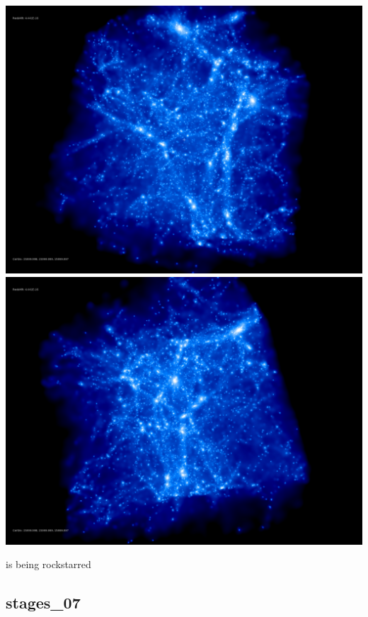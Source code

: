 \includegraphics[scale=0.1]{NGenIC_26214/rotate_00074.jpg} 
\includegraphics[scale=0.1]{NGenIC_26214/rotate_00131.jpg}

is being rockstarred  \\

% 
%
%
%
%
%
%
%

\newpage
\subsection{stages\_07}

% 
% 

